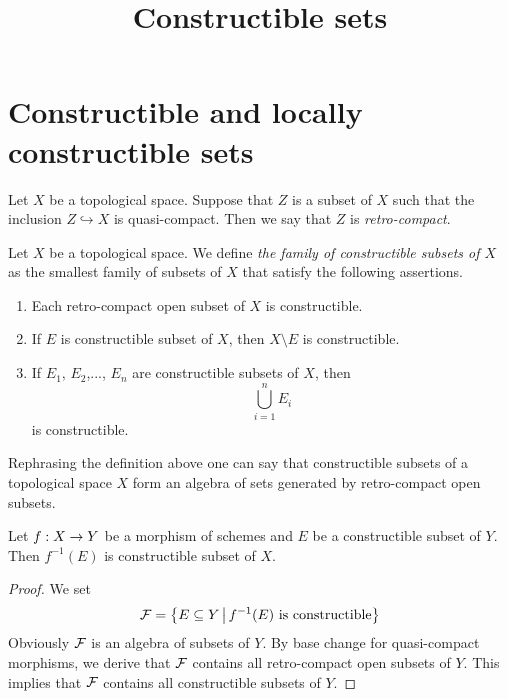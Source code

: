 



\title{Constructible sets}
\date{}
\maketitle

\section{Constructible and locally constructible sets}

\begin{definition}
Let $X$ be a topological space. Suppose that $Z$ is a subset of $X$ such that the inclusion $Z\hookrightarrow X$ is quasi-compact. Then we say that $Z$ is \textit{retro-compact}.
\end{definition}

\begin{definition}
Let $X$ be a topological space. We define \textit{the family of constructible subsets of $X$} as the smallest family of subsets of $X$ that satisfy the following assertions.
\begin{enumerate}[label=\textbf{(\arabic*)}, leftmargin=*]
\item Each retro-compact open subset of $X$ is constructible.
\item If $E$ is constructible subset of $X$, then $X\setminus E$ is constructible. 
\item If $E_1$, $E_2$,..., $E_n$ are constructible subsets of $X$, then 
$$\bigcup_{i=1}^nE_i$$ 
is constructible.
\end{enumerate}  
\end{definition}
\noindent
Rephrasing the definition above one can say that constructible subsets of a topological space $X$ form an algebra of sets generated by retro-compact open subsets.

\begin{fact}\label{fact:constructiblepreimages}
Let $f:X\rightarrow Y$ be a morphism of schemes and $E$ be a constructible subset of $Y$. Then $f^{-1}(E)$ is constructible subset of $X$.
\end{fact}
\begin{proof}
We set
$${\mathcal F} = \big\{E\subseteq Y\,\big|\,f^{-1}(E)\mbox{ is constructible}\big\}$$
Obviously ${\mathcal F}$ is an algebra of subsets of $Y$. By base change for quasi-compact morphisms, we derive that ${\mathcal F}$ contains all retro-compact open subsets of $Y$. This implies that ${\mathcal F}$ contains all constructible subsets of $Y$.
\end{proof}

